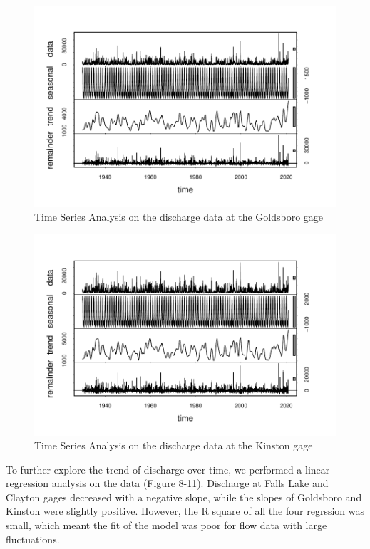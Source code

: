 \documentclass[
  12pt,
]{article}
\begin{document}
\begin{figure}

\includegraphics{Gardner_Zeng_ENV872_Project_files/figure-latex/Time series Goldsboro-1} \hfill{}

\caption{Time Series Analysis on the discharge data at the Goldsboro gage}\label{fig:Time series Goldsboro}
\end{figure}

\begin{figure}

\includegraphics{Gardner_Zeng_ENV872_Project_files/figure-latex/Time series Kinston-1} \hfill{}

\caption{Time Series Analysis on the discharge data at the Kinston gage}\label{fig:Time series Kinston}
\end{figure}

To further explore the trend of discharge over time, we performed a
linear regression analysis on the data (Figure 8-11). Discharge at Falls
Lake and Clayton gages decreased with a negative slope, while the slopes
of Goldsboro and Kinston were slightly positive. However, the R square
of all the four regrssion was small, which meant the fit of the model
was poor for flow data with large fluctuations.
\end{document}
